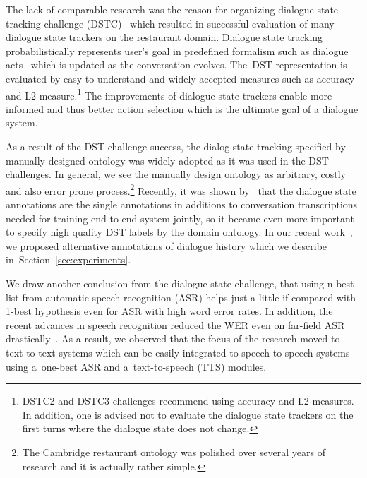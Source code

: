 \documentclass[11pt]{article}
\begin{document}
The lack of comparable research was the reason for organizing dialogue state tracking challenge (DSTC)~\cite{dstcwilliams} which resulted in successful evaluation of many dialogue state trackers on the restaurant domain.
Dialogue state tracking probabilistically represents user's goal in predefined formalism such as dialogue acts~\cite{dstcwilliams,hendersonsecond,hendersonthird} which is updated as the conversation evolves.
The~DST representation is evaluated by easy to understand and widely accepted measures such as accuracy and L2 measure.\footnote{DSTC2 and DSTC3 challenges recommend using accuracy and L2 measures. In addition, one is advised not to evaluate the dialogue state trackers on the first turns where the dialogue state does not change.}
The improvements of dialogue state trackers enable more informed and thus better action selection which is the ultimate goal of a dialogue system.

As a result of the DST challenge success, the dialog state tracking specified by manually designed ontology was widely adopted as it was used in the DST challenges.
In general, we see the manually design ontology as arbitrary, costly and also error prone process.\footnote{The Cambridge restaurant ontology was polished over several years of research and it is actually rather simple.}
Recently, it was shown by~\cite{wen_networkbased_2016} that the dialogue state annotations are the single annotations in additions to conversation transcriptions needed for training end-to-end system jointly, so it became even more important to specify high quality DST labels by the domain ontology.
In our recent work~\cite{platek2016wochat}, we proposed alternative annotations of dialogue history which we describe in~Section~\ref{sec:experiments}.

We draw another conclusion from the dialogue state challenge, that using n-best list from automatic speech recognition (ASR) helps just a little if compared with 1-best hypothesis even for ASR with high word error rates.
In addition, the recent advances in speech recognition reduced the WER even on far-field ASR drastically~\cite{peddinti_jhu_2015,zhang_highway_2016}.
As a result, we observed that the focus of the research moved to text-to-text systems which can be easily integrated to speech to speech systems using a~one-best ASR and a~text-to-speech (TTS) modules.
\end{document}

